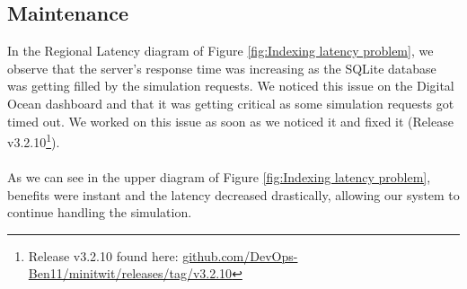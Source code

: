 \subsection{Maintenance}
In the Regional Latency diagram of Figure \ref{fig:Indexing latency problem}, we observe that the server's response time was increasing as the SQLite database was getting filled by the simulation requests. We noticed this issue on the Digital Ocean dashboard and that it was getting critical as some simulation requests got timed out. We worked on this issue as soon as we noticed it and fixed it (Release v3.2.10\footnote{Release v3.2.10 found here: 
\href{https://github.com/DevOps-Ben11/minitwit/releases/tag/v3.2.10}{github.com/DevOps-Ben11/minitwit/releases/tag/v3.2.10}}).
\\
\\
As we can see in the upper diagram of Figure \ref{fig:Indexing latency problem}, benefits were instant and the latency decreased drastically, allowing our system to continue handling the simulation. 
